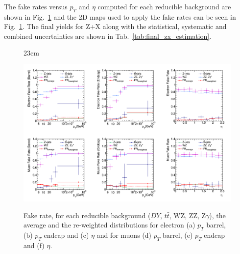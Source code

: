 The fake rates versus $p_{T}$ and $\eta$ computed for each reducible background are shown in Fig.~\ref{fig:fr_pt_eta_1D_systematics} and the 2D maps used to apply the fake rates can be seen in Fig.~\ref{fig:fr_pt_eta_1D_systematics}. The final yields for Z+X along with the statistical, systematic and combined uncertainties are shown in Tab.~\ref{tab:final_zx_estimation}.

\begin{landscape}
\begin{figure}[htbp]{23cm}
	\caption{Fake rate, for each reducible background ($DY$, $t\bar{t}$, WZ, ZZ, Z$\gamma$), the average and the re-weighted distributions for electron (a) $p_{T}$ barrel, (b) $p_{T}$ endcap and (c) $\eta$ and for muons (d) $p_{T}$ barrel, (e) $p_{T}$ endcap and (f) $\eta$.}
	\centering
	\includegraphics[scale=0.5]{ChapterAnalysis/figs/fake_rate_1D_pt_eta_for_systematics}
	\label{fig:fr_pt_eta_1D_systematics}
\end{figure}
\end{landscape}

